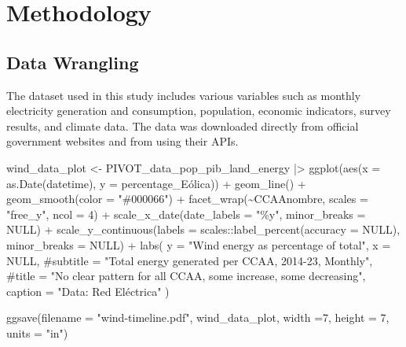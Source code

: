 \documentclass[
]{report}
\newenvironment{Shaded}{\begin{snugshade}}{\end{snugshade}}
\newcommand{\AttributeTok}[1]{\textcolor[rgb]{0.40,0.45,0.13}{#1}}
\newcommand{\CommentTok}[1]{\textcolor[rgb]{0.37,0.37,0.37}{#1}}
\newcommand{\ConstantTok}[1]{\textcolor[rgb]{0.56,0.35,0.01}{#1}}
\newcommand{\DecValTok}[1]{\textcolor[rgb]{0.68,0.00,0.00}{#1}}
\newcommand{\FunctionTok}[1]{\textcolor[rgb]{0.28,0.35,0.67}{#1}}
\newcommand{\NormalTok}[1]{\textcolor[rgb]{0.00,0.23,0.31}{#1}}
\newcommand{\OtherTok}[1]{\textcolor[rgb]{0.00,0.23,0.31}{#1}}
\newcommand{\SpecialCharTok}[1]{\textcolor[rgb]{0.37,0.37,0.37}{#1}}
\newcommand{\StringTok}[1]{\textcolor[rgb]{0.13,0.47,0.30}{#1}}
\begin{document}
\hypertarget{methodology}{%
\chapter{Methodology}\label{methodology}}

\hypertarget{data-wrangling}{%
\section{Data Wrangling}\label{data-wrangling}}

The dataset used in this study includes various variables such as
monthly electricity generation and consumption, population, economic
indicators, survey results, and climate data. The data was downloaded
directly from official government websites and from using their APIs.

\begin{Shaded}
\begin{Highlighting}[]
\NormalTok{wind\_data\_plot }\OtherTok{\textless{}{-}}\NormalTok{ PIVOT\_data\_pop\_pib\_land\_energy }\SpecialCharTok{|\textgreater{}} 
  \FunctionTok{ggplot}\NormalTok{(}\FunctionTok{aes}\NormalTok{(}\AttributeTok{x =} \FunctionTok{as.Date}\NormalTok{(datetime), }\AttributeTok{y =}\NormalTok{ percentage\_Eólica)) }\SpecialCharTok{+}
  \FunctionTok{geom\_line}\NormalTok{() }\SpecialCharTok{+}
  \FunctionTok{geom\_smooth}\NormalTok{(}\AttributeTok{color =} \StringTok{"\#000066"}\NormalTok{) }\SpecialCharTok{+}
  \FunctionTok{facet\_wrap}\NormalTok{(}\SpecialCharTok{\textasciitilde{}}\NormalTok{CCAAnombre, }\AttributeTok{scales =} \StringTok{"free\_y"}\NormalTok{, }\AttributeTok{ncol =} \DecValTok{4}\NormalTok{) }\SpecialCharTok{+}
  \FunctionTok{scale\_x\_date}\NormalTok{(}\AttributeTok{date\_labels =} \StringTok{"\textquotesingle{}\%y"}\NormalTok{, }\AttributeTok{minor\_breaks =} \ConstantTok{NULL}\NormalTok{) }\SpecialCharTok{+}
  \FunctionTok{scale\_y\_continuous}\NormalTok{(}\AttributeTok{labels =}\NormalTok{ scales}\SpecialCharTok{::}\FunctionTok{label\_percent}\NormalTok{(}\AttributeTok{accuracy =} \ConstantTok{NULL}\NormalTok{), }\AttributeTok{minor\_breaks =} \ConstantTok{NULL}\NormalTok{) }\SpecialCharTok{+}
  \FunctionTok{labs}\NormalTok{(}
    \AttributeTok{y =} \StringTok{"Wind energy as percentage of total"}\NormalTok{,}
    \AttributeTok{x =} \ConstantTok{NULL}\NormalTok{,}
    \CommentTok{\#subtitle = "Total energy generated per CCAA, 2014{-}23, Monthly",}
    \CommentTok{\#title = "No clear pattern for all CCAA, some increase, some decreasing",}
    \AttributeTok{caption =} \StringTok{"Data: Red Eléctrica"}
\NormalTok{  ) }

\FunctionTok{ggsave}\NormalTok{(}\AttributeTok{filename =} \StringTok{"wind{-}timeline.pdf"}\NormalTok{, wind\_data\_plot, }
       \AttributeTok{width =}\DecValTok{7}\NormalTok{, }\AttributeTok{height =} \DecValTok{7}\NormalTok{, }\AttributeTok{units =} \StringTok{"in"}\NormalTok{)}
\end{Highlighting}
\end{Shaded}
\end{document}
